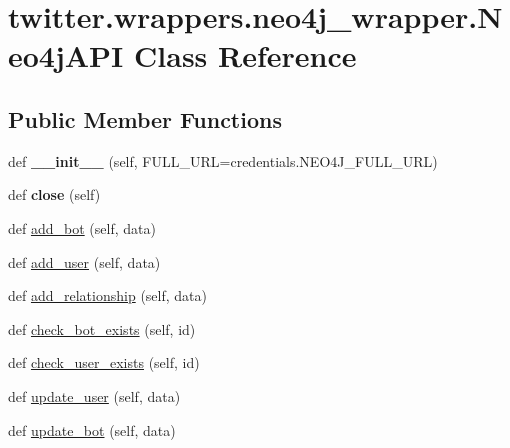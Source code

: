\hypertarget{classtwitter_1_1wrappers_1_1neo4j__wrapper_1_1Neo4jAPI}{}\section{twitter.\+wrappers.\+neo4j\+\_\+wrapper.\+Neo4j\+A\+PI Class Reference}
\label{classtwitter_1_1wrappers_1_1neo4j__wrapper_1_1Neo4jAPI}
\subsection*{Public Member Functions}
\begin{DoxyCompactItemize}
\item 
\mbox{\label{classtwitter_1_1wrappers_1_1neo4j__wrapper_1_1Neo4jAPI_a38ea3ba22911e158c867c1e15829ca46}} 
def {\bfseries \+\_\+\+\_\+init\+\_\+\+\_\+} (self, F\+U\+L\+L\+\_\+\+U\+RL=credentials.\+N\+E\+O4\+J\+\_\+\+F\+U\+L\+L\+\_\+\+U\+RL)
\item 
\mbox{\label{classtwitter_1_1wrappers_1_1neo4j__wrapper_1_1Neo4jAPI_ace5969c9108654dd33bde37ef32ac08f}} 
def {\bfseries close} (self)
\item 
def \hyperlink{classtwitter_1_1wrappers_1_1neo4j__wrapper_1_1Neo4jAPI_a188c0f42742ff0ae94017a161e6c2633}{add\+\_\+bot} (self, data)
\item 
def \hyperlink{classtwitter_1_1wrappers_1_1neo4j__wrapper_1_1Neo4jAPI_ad165965732c986fd93cbd0dd8dd23ccc}{add\+\_\+user} (self, data)
\item 
def \hyperlink{classtwitter_1_1wrappers_1_1neo4j__wrapper_1_1Neo4jAPI_a754d17ed04106caedac79a38d0b6d6e6}{add\+\_\+relationship} (self, data)
\item 
def \hyperlink{classtwitter_1_1wrappers_1_1neo4j__wrapper_1_1Neo4jAPI_a09920f8af8cb34875f6366969a8deb16}{check\+\_\+bot\+\_\+exists} (self, id)
\item 
def \hyperlink{classtwitter_1_1wrappers_1_1neo4j__wrapper_1_1Neo4jAPI_ab4ab706214e7d29521c47a40fe1e5b49}{check\+\_\+user\+\_\+exists} (self, id)
\item 
def \hyperlink{classtwitter_1_1wrappers_1_1neo4j__wrapper_1_1Neo4jAPI_a8efba948fa1e68c7b3fe9a604bce53db}{update\+\_\+user} (self, data)
\item 
def \hyperlink{classtwitter_1_1wrappers_1_1neo4j__wrapper_1_1Neo4jAPI_a15bc8d8d0b8752f6295ab8f1e5af6986}{update\+\_\+bot} (self, data)

\end{DoxyCompactItemize}

